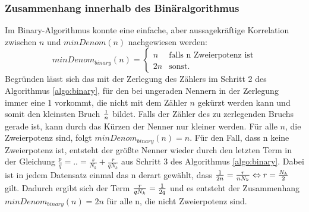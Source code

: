 
\subsubsection{Zusammenhang innerhalb des Binäralgorithmus}\label{subsubsec:ZsmHangBinary}
Im Binary-Algorithmus konnte eine einfache, aber aussagekräftige Korrelation zwischen $n$ und $minDenom(n)$ nachgewiesen werden:
\begin{equation*}
	minDenom_{binary}(n) = 
	\begin{cases}
		n & \text{falls n Zweierpotenz ist} \\
		2n & \text{sonst.}
	\end{cases}
\end{equation*}
Begründen lässt sich das mit der Zerlegung des Zählers im Schritt 2 des Algorithmus \ref{algo:binary}, für den bei ungeraden Nennern in der Zerlegung immer eine 1 vorkommt, die nicht mit dem Zähler $n$ gekürzt werden kann und somit den kleinsten Bruch $\frac{1}{n}$ bildet. Falls der Zähler des zu zerlegenden Bruchs gerade ist, kann durch das Kürzen der Nenner nur kleiner werden. Für alle $n$, die Zweierpotenz sind, folgt $minDenom_{binary}(n) = n$. Für den Fall, dass n keine Zweierpotenz ist, entsteht der größte Nenner wieder durch den letzten Term in der Gleichung $\frac{p}{q} = .. = \frac{s}{N_k}+\frac{r}{qN_k}$ aus Schritt 3 des Algorithmus \ref{algo:binary}. Dabei ist in jedem Datensatz einmal das n derart gewählt, dass $\frac{1}{2n} = \frac{r}{nN_k} \Leftrightarrow r = \frac{N_k}{2}$ gilt. Dadurch ergibt sich der Term $\frac{r}{qN_k} = \frac{1}{2q}$ und es entsteht der Zusammenhang $minDenom_{binary}(n) = 2n$ für alle n, die nicht Zweierpotenz sind.

